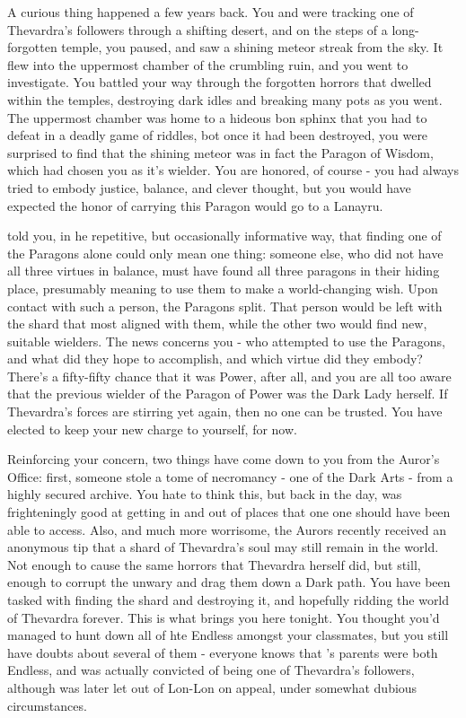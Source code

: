 \documentclass[char]{Katmeers}
\begin{document}
A curious thing happened a few years back. You and \cFairy{} were tracking one of Thevardra's followers through a shifting desert, and on the steps of a long-forgotten temple, you paused, and saw a shining meteor streak from the sky. It flew into the uppermost chamber of the crumbling ruin, and you went to investigate. You battled your way through the forgotten horrors that dwelled within the temples, destroying dark idles and breaking many pots as you went. The uppermost chamber was home to a hideous bon sphinx that you had to defeat in a deadly game of riddles, bot once it had been destroyed, you were surprised to find that the shining meteor was in fact the Paragon of Wisdom, which had chosen you as it's wielder. You are honored, of course - you had always tried to embody justice, balance, and clever thought, but you would have expected the honor of carrying this Paragon would go to a Lanayru.

\cFairy{} told you, in he repetitive, but occasionally informative way, that finding one of the Paragons alone could only mean one thing: someone else, who did not have all three virtues in balance, must have found all three paragons in their hiding place, presumably meaning to use them to make a world-changing wish. Upon contact with such a person, the Paragons split. That person would be left with the shard that most aligned with them, while the other two would find new, suitable wielders. The news concerns you - who attempted to use the Paragons, and what did they hope to accomplish, and which virtue did they embody? There's a fifty-fifty chance that it was Power, after all, and you are all too aware that the previous wielder of the Paragon of  Power was the Dark Lady herself. If Thevardra's forces are stirring yet again, then no one can be trusted. You have elected to keep your new charge to yourself, for now.

Reinforcing your concern, two things have come down to you from the Auror's Office: first, someone stole a tome of necromancy - one of the Dark Arts - from a highly secured archive. You hate to think this, but back in the day, \cGinny{} was frighteningly good at getting in and out of places that one one should have been able to access. Also, and much more worrisome, the Aurors recently received an anonymous tip that a shard of Thevardra's soul may still remain in the world. Not enough to cause the same horrors that Thevardra herself did, but still, enough to corrupt the unwary and drag them down a Dark path. You have been tasked with finding the shard and destroying it, and hopefully ridding the world of Thevardra forever. This is what brings you here tonight. You thought you'd managed to hunt down all of hte Endless amongst your classmates, but you still have doubts about several of them - everyone knows that \cMalfoy{}'s parents were both Endless, and \cLucius{} was actually convicted of being one of Thevardra's followers, although \cLucius{\they} was later let out of Lon-Lon on appeal, under somewhat dubious circumstances.
\end{document}
